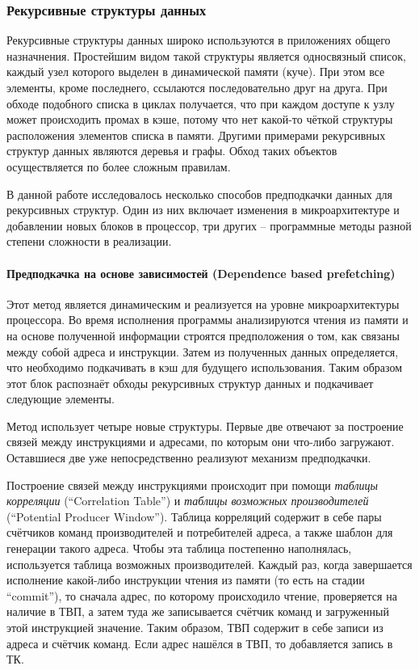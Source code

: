 \documentclass[12pt,a4paper]{article}
\begin{document}
\subsubsection{Рекурсивные структуры данных}

\indent

Рекурсивные структуры данных широко используются в приложениях общего назначнения. Простейшим видом такой структуры является односвязный список, каждый узел которого выделен в динамической памяти (куче). При этом все элементы, кроме последнего, ссылаются последовательно друг на друга. При обходе подобного списка в циклах получается, что при каждом доступе к узлу может происходить промах в кэше, потому что нет какой-то чёткой структуры расположения элементов списка в памяти. Другими примерами рекурсивных структур данных являются деревья и графы. Обход таких объектов осуществляется по более сложным правилам.

В данной работе исследовалось несколько способов предподкачки данных для рекурсивных структур. Один из них включает изменения в микроархитектуре и добавлении новых блоков в процессор, три других -- программные методы разной степени сложности в реализации.

\paragraph{Предподкачка на основе зависимостей (Dependence based prefetching)}

Этот метод является динамическим и реализуется на уровне микроархитектуры процессора. Во время исполнения программы анализируются чтения из памяти и на основе полученной информации строятся предположения о том, как связаны между собой адреса и инструкции. Затем из полученных данных определяется, что необходимо подкачивать в кэш для будущего использования. Таким образом этот блок распознаёт обходы рекурсивных структур данных и подкачивает следующие элементы.

Метод использует четыре новые структуры. Первые две отвечают за построение связей между инструкциями и адресами, по которым они что-либо загружают. Оставшиеся две уже непосредственно реализуют механизм предподкачки.

Построение связей между инструкциями происходит при помощи \emph{таблицы корреляции} (``Correlation Table'') и \emph{таблицы возможных производителей} (``Potential Producer Window''). Таблица корреляций содержит в себе пары счётчиков команд производителей и потребителей адреса, а также шаблон для генерации такого адреса. Чтобы эта таблица постепенно наполнялась, используется таблица возможных производителей. Каждый раз, когда завершается исполнение какой-либо инструкции чтения из памяти (то есть на стадии ``commit''), то сначала адрес, по которому происходило чтение, проверяется на наличие в ТВП, а затем туда же записывается счётчик команд и загруженный этой инструкцией значение. Таким образом, ТВП содержит в себе записи из адреса и счётчик команд. Если адрес нашёлся в ТВП, то добавляется запись в ТК.
\end{document}
